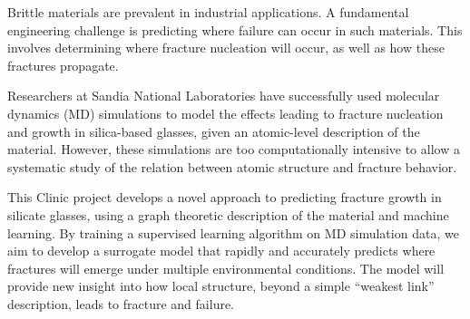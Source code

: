 Brittle materials are prevalent in industrial applications. A fundamental engineering challenge is predicting where failure can occur in such materials. This involves determining where fracture nucleation will occur, as well as how these fractures propagate.

Researchers at Sandia National Laboratories have successfully used molecular dynamics (MD) simulations to model the effects leading to fracture nucleation and growth in silica-based glasses, given an atomic-level description of the material. However, these simulations are too computationally intensive to allow a systematic study of the relation between atomic structure and fracture behavior.

This Clinic project develops a novel approach to predicting fracture growth in silicate glasses, using a graph theoretic description of the material and machine learning. By training a supervised learning algorithm on MD simulation data, we aim to develop a surrogate model that rapidly and accurately predicts where fractures will emerge under multiple environmental conditions. The model will provide new insight into how local structure, beyond a simple ``weakest link'' description, leads to fracture and failure.
